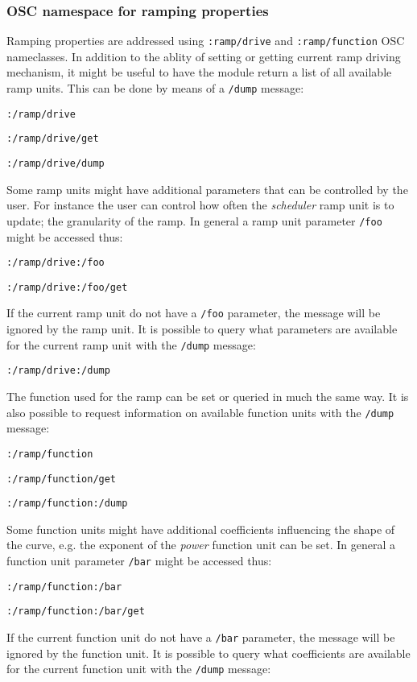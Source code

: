 \documentclass{sig-alternate}
\begin{document}
\subsubsection{OSC namespace for ramping properties} %
\label{ssub:osc_namespace_for_ramping_properties}

Ramping properties are addressed using \texttt{:ramp/drive} and \texttt{:ramp/function} OSC nameclasses. In addition to the ablity of setting or getting current ramp driving mechanism, it might be useful to have the module return a list of all available ramp units. This can be done by means of a \texttt{/dump} message:

\texttt{:/ramp/drive}

\texttt{:/ramp/drive/get}

\texttt{:/ramp/drive/dump}

Some ramp units might have additional parameters that can be controlled by the user. For instance the user can control how often the \emph{scheduler} ramp unit is to update; the granularity of the ramp.  In general a ramp unit parameter \texttt{/foo} might be accessed thus:


\texttt{:/ramp/drive:/foo}

\texttt{:/ramp/drive:/foo/get}

If the current ramp unit do not have a \texttt{/foo} parameter, the message will be ignored by the ramp unit. It is possible to query what parameters are available for the current ramp unit with the \texttt{/dump} message:

\texttt{:/ramp/drive:/dump}

The function used for the ramp can be set or queried in much the same way. It is also possible to request information on available function units with the \texttt{/dump} message:

\texttt{:/ramp/function}

\texttt{:/ramp/function/get}

\texttt{:/ramp/function:/dump}

Some function units might have additional coefficients influencing the shape of the curve, e.g. the exponent of the \emph{power} function unit can be set. In general a function unit parameter \texttt{/bar} might be accessed thus:

\texttt{:/ramp/function:/bar}

\texttt{:/ramp/function:/bar/get}

If the current function unit do not have a \texttt{/bar} parameter, the message will be ignored by the function unit. It is possible to query what coefficients are available for the current function unit with the \texttt{/dump} message:
\end{document}
